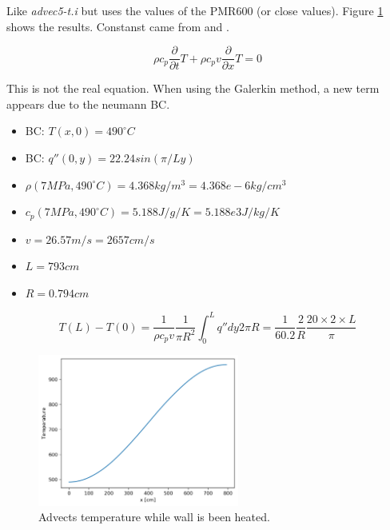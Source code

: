 \documentclass[11pt,letterpaper]{article}
\begin{document}
    Like \textit{advec5-t.i} but uses the values of the PMR600 (or close values).
    Figure \ref{fig:advec6-t} shows the results.
    Constanst came from \cite{tak_numerical_2008} and \cite{tak_development_2014}.

	\begin{equation}
    \rho c_p \frac{\partial}{\partial t}T + \rho c_p v \frac{\partial}{\partial x} T = 0
	\end{equation}

	This is not the real equation. When using the Galerkin method, a new term appears due to the neumann BC.

	\begin{itemize}
		\item BC: $T(x, 0) = 490^{\circ}C$
		\item BC: $q''(0, y) = 22.24 sin (\pi/L y)$
		\item $\rho (7 MPa, 490^{\circ}C) = 4.368 kg/m^3 = 4.368e-6 kg/cm^3$
		\item $c_p (7 MPa, 490^{\circ}C) = 5.188 J/g/K = 5.188e3 J/kg/K $
		\item $v = 26.57 m/s = 2657 cm/s$
		\item $L = 793 cm$
		\item $R = 0.794 cm$
	\end{itemize}

	\begin{equation}
	T(L) - T(0) = \frac{1}{\rho c_p v}\frac{1}{\pi R^2}\int^L_0 q'' dy 2 \pi R = \frac{1}{60.2} \frac{2}{R} \frac{20 \times 2 \times L}{\pi}
	\end{equation}

	\begin{figure}[htbp!]
		\centering
		\includegraphics[height=5cm]{advec6-t-251}
		\caption{Advects temperature while wall is been heated.}
		\label{fig:advec6-t}
	\end{figure}

\pagebreak

% 
\end{document}
